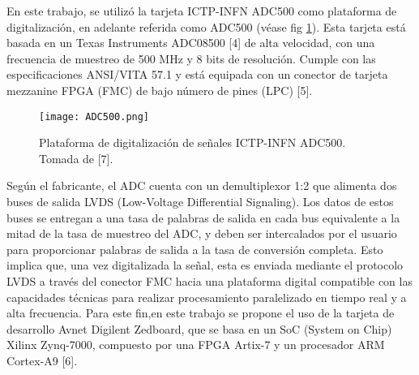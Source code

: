 \documentclass[]{book}
\begin{document}
\noindent En este trabajo, se utilizó la tarjeta ICTP-INFN ADC500 como plataforma de digitalización, en adelante referida como ADC500 (véase fig \ref*{fig:adc500}). Esta tarjeta está basada en un Texas Instruments ADC08500 [4] de alta velocidad, con una frecuencia de muestreo de 500 MHz y 8 bits de resolución. Cumple con las especificaciones ANSI/VITA 57.1 y está equipada con un conector de tarjeta mezzanine FPGA (FMC) de bajo número de pines (LPC) [5].\\

\begin{figure}[h]
    \centering
    \texttt{[image: ADC500.png]}
    \caption{Plataforma de digitalización de señales ICTP-INFN ADC500. Tomada de [7].}
    \label{fig:adc500}

\end{figure}

\noindent Según el fabricante, el ADC cuenta con un demultiplexor 1:2 que alimenta dos buses de salida LVDS (Low-Voltage Differential Signaling). Los datos de estos buses se entregan a una tasa de palabras de salida en cada bus equivalente a la mitad de la tasa de muestreo del ADC, y deben ser intercalados por el usuario para proporcionar palabras de salida a la tasa de conversión completa. Esto implica que, una vez digitalizada la señal, esta es enviada mediante el protocolo LVDS a través del conector FMC hacia una plataforma digital compatible con las capacidades técnicas para realizar procesamiento paralelizado en tiempo real y a alta frecuencia. Para este fin,en este trabajo se propone el uso de la tarjeta de desarrollo Avnet Digilent Zedboard, que se basa en un SoC (System on Chip) Xilinx Zynq-7000, compuesto por una FPGA Artix-7 y un procesador ARM Cortex-A9 [6].
\end{document}
